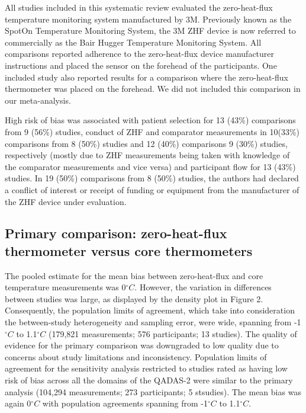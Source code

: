 \documentclass[smallextended]{svjour3}       %
\begin{document}
All studies included in this systematic review evaluated the
zero-heat-flux temperature monitoring system manufactured by 3M.
Previously known as the SpotOn Temperature Monitoring System, the 3M ZHF
device is now referred to commercially as the Bair Hugger Temperature
Monitoring System. All comparisons reported adherence to the
zero-heat-flux device manufacturer instructions and placed the sensor on
the forehead of the participants. One included study also reported
results for a comparison where the zero-heat-flux thermometer was placed
on the forehead. We did not included this comparison in our
meta-analysis.

High risk of bias was associated with patient selection for 13 (43\%)
comparisons from 9 (56\%) studies, conduct of ZHF and comparator
measurements in 10(33\%) comparisons from 8 (50\%) studies and 12 (40\%)
comparisons 9 (30\%) studies, respectively (mostly due to ZHF
measurements being taken with knowledge of the comparator measurements
and vice versa) and participant flow for 13 (43\%) studies. In 19 (50\%)
comparisons from 8 (50\%) studies, the authors had declared a conflict
of interest or receipt of funding or equipment from the manufacturer of
the ZHF device under evaluation.

\hypertarget{primary-comparison-zero-heat-flux-thermometer-versus-core-thermometers}{%
\subsection{Primary comparison: zero-heat-flux thermometer versus core
thermometers}\label{primary-comparison-zero-heat-flux-thermometer-versus-core-thermometers}}

The pooled estimate for the mean bias between zero-heat-flux and core
temperature measurements was 0\(^\circ C\). However, the variation in
differences between studies was large, as displayed by the density plot
in Figure 2. Consequently, the population limits of agreement, which
take into consideration the between-study heterogeneity and sampling
error, were wide, spanning from -1\(^\circ C\) to 1.1\(^\circ C\)
(179,821 measurements; 576 participants; 13 studies). The quality of
evidence for the primary comparison was downgraded to low quality due to
concerns about study limitations and inconsistency. Population limits of
agreement for the sensitivity analysis restricted to studies rated as
having low risk of bias across all the domains of the QADAS-2 were
similar to the primary analysis (104,294 measurements; 273 participants;
5 stsudies). The mean bias was again 0\(^\circ C\) with population
agreements spanning from -1\(^\circ C\) to 1.1\(^\circ C\).
\end{document}
